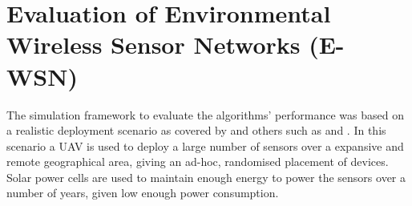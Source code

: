 \section{Evaluation of Environmental Wireless Sensor Networks (E-WSN)}
\label{section:experimental}	
The simulation framework to evaluate the algorithms' performance was based on a realistic deployment scenario as covered by  \cite{Gomez2015} and others such as \cite{Jha2016} and \cite{Avram}. In this scenario a UAV is used to deploy a large number of sensors over a expansive and remote geographical area, giving an ad-hoc, randomised placement of devices. Solar power cells are used to maintain enough energy to power the sensors over a number of years, given low enough power consumption.


